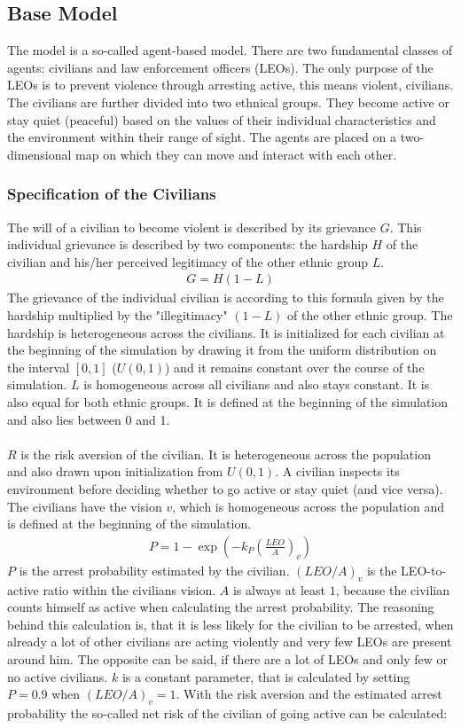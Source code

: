 \documentclass[11pt]{article}
\begin{document}
\subsection{Base Model}
\label{subsec:base_model}
The model is a so-called agent-based model. There are two fundamental classes of agents: civilians and law enforcement officers (LEOs). The only purpose of the LEOs is to prevent violence through arresting active, this means violent, civilians. The civilians are further divided into two ethnical groups. They become active or stay quiet (peaceful) based on the values of their individual characteristics and the environment within their range of sight. The agents are placed on a two-dimensional map on which they can move and interact with each other.

\subsubsection{Specification of the Civilians}
The will of a civilian to become violent is described by its grievance $G$. This individual grievance is described by two components: the hardship $H$ of the civilian and his/her perceived legitimacy of the other ethnic group $L$.
\begin{align}
G = H (1 - L)
\end{align}
The grievance of the individual civilian is according to this formula given by the hardship multiplied by the "illegitimacy" $(1 - L)$ of the other ethnic group. The hardship is heterogeneous across the civilians. It is initialized for each civilian at the beginning of the simulation by drawing it from the uniform distribution on the interval $[0,1]$ ($U(0,1)$) and it remains constant over the course of the simulation. $L$ is homogeneous across all civilians and also stays constant. It is also equal for both ethnic groups. It is defined at the beginning of the simulation and also lies between 0 and 1.\\
\\
$R$ is the risk aversion of the civilian. It is heterogeneous across the population and also drawn upon initialization from $U(0,1)$. A civilian inspects its environment before deciding whether to go active or stay quiet (and vice versa). The civilians have the vision $v$, which is homogeneous across the population and is defined at the beginning of the simulation.
\begin{align}
P = 1 - \exp \left( - k_P \left( \frac{LEO}{A} \right)_v \right)
\end{align}
$P$ is the arrest probability estimated by the civilian. $\left(LEO/A\right)_v$ is the LEO-to-active ratio within the civilians vision. $A$ is always at least $1$, because the civilian counts himself as active when calculating the arrest probability. The reasoning behind this calculation is, that it is less likely for the civilian to be arrested, when already a lot of other civilians are acting violently and very few LEOs are present around him. The opposite can be said, if there are a lot of LEOs and only few or no active civilians. $k$ is a constant parameter, that is calculated by setting $P = 0.9$ when $\left(LEO/A\right)_v = 1$. With the risk aversion and the estimated arrest probability the so-called net risk of the civilian of going active can be calculated:
\end{document}
